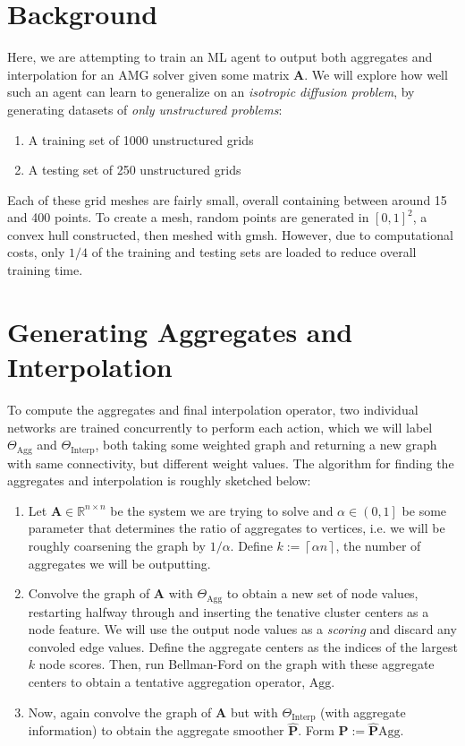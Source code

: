 \documentclass{article}
\newcommand{\mat}[1]{\bm{{#1}}}
\newcommand{\ceil}[1]{\left\lceil #1 \right\rceil}
\begin{document}
\section{Background}
Here, we are attempting to train an ML agent to output both aggregates and interpolation for an AMG solver given some matrix $\mat{A}$.  We will explore how well such an agent can learn to generalize on an \textit{isotropic diffusion problem}, by generating datasets of \textit{only unstructured problems}:
\begin{enumerate}
\item A training set of 1000 unstructured grids
\item A testing set of 250 unstructured grids
\end{enumerate}
Each of these grid meshes are fairly small, overall containing between around 15 and 400 points.  To create a mesh, random points are generated in $\left[0,1\right]^2$, a convex hull constructed, then meshed with gmsh.  However, due to computational costs, only $1/4$ of the training and testing sets are loaded to reduce overall training time.

\section{Generating Aggregates and Interpolation}
To compute the aggregates and final interpolation operator, two individual networks are trained concurrently to perform each action, which we will label $\Theta_{\text{Agg}}$ and $\Theta_{\text{Interp}}$, both taking some weighted graph and returning a new graph with same connectivity, but different weight values.  The algorithm for finding the aggregates and interpolation is roughly sketched below:
\begin{enumerate}
\item Let $\mat{A} \in \mathbb{R}^{n \times n}$ be the system we are trying to solve and $\alpha \in \left(0, 1\right]$ be some parameter that determines the ratio of aggregates to vertices, i.e. we will be roughly coarsening the graph by $1/\alpha$.  Define $k := \ceil{\alpha n}$, the number of aggregates we will be outputting.
\item Convolve the graph of $\mat{A}$ with $\Theta_{\text{Agg}}$ to obtain a new set of node values, restarting halfway through and inserting the tenative cluster centers as a node feature.  We will use the output node values as a \textit{scoring} and discard any convoled edge values.  Define the aggregate centers as the indices of the largest $k$ node scores.  Then, run Bellman-Ford on the graph with these aggregate centers to obtain a tentative aggregation operator, $\text{Agg}$.
\item Now, again convolve the graph of $\mat{A}$ but with $\Theta_{\text{Interp}}$ (with aggregate information) to obtain the aggregate smoother $\mat{\hat{P}}$.  Form $\mat{P} := \mat{\hat{P}}\text{Agg}$.
\end{enumerate}
\end{document}
